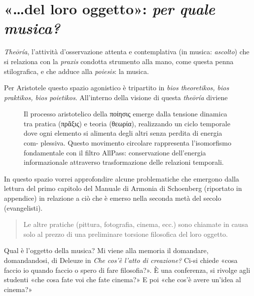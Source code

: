 \documentclass{../../lib/gs}
\begin{document}
\section{«\ldots del loro oggetto»: \emph{per quale musica?}}

\emph{Theōría}, l'attività d'osservazione attenta e contemplativa (in musica:
\emph{ascolto}) che si relaziona con la \emph{praxis} condotta strumento alla
mano, come questa penna stilografica, e che adduce alla \emph{poiesis}: la musica.

Per Aristotele questo spazio agonistico è tripartito in \emph{bios theoretikos,
bios praktikos, bios poietikos}. All'interno della visione di questa
\emph{theōría} diviene

\begin{figure}[htbp]
\begin{center}
\caption{Il processo aristotelico della ποίησις emerge dalla tensione dinamica
tra pratica (πρᾶξις) e teoria (θεωρία), realizzando un ciclo temporale dove ogni
elemento si alimenta degli altri senza perdita di energia com- plessiva. Questo
movimento circolare rappresenta l’isomorfismo fondamentale con il filtro AllPass:
conservazione dell’energia informazionale attraverso trasformazione delle
relazioni temporali.}
\label{poiesis}
\end{center}
\end{figure}

In questo spazio vorrei approfondire alcune problematiche che emergono dalla lettura del primo capitolo del Manuale di Armonia di Schoenberg (riportato in appendice) \cite{schonberg1970} in relazione a ciò che è emerso nella seconda metà del secolo (evangelisti).

\begin{quote}
\begin{sf}
\small
  Le altre pratiche (pittura, fotografia, cinema, ecc.) sono chiamate in causa
  solo al prezzo di una preliminare torsione filosofica del loro oggetto.
  \cite{ronchi2001}
  \end{sf}
\end{quote}

Qual è l'oggetto della musica? Mi viene alla memoria il domandare, domandandosi,
di Deleuze in \emph{Che cos'è l'atto di creazione?} \cite{deleuze2009} Ci-si
chiede «cosa faccio io quando faccio o spero di fare filosofia?». È una
conferenza, si rivolge agli studenti «che cosa fate voi che fate cinema?» E poi
«che cos'è avere un'idea al cinema?»
\end{document}
